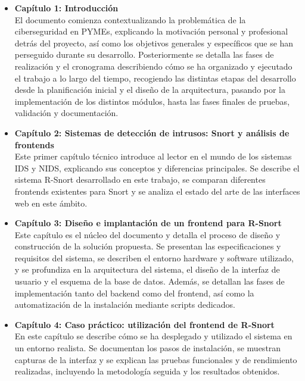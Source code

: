 \documentclass[11pt,a4paper,twoside]{report}
\begin{document}
\begin{itemize}
	\item \textbf{Capítulo 1: Introducción}\\
	\hspace*{1em}El documento comienza contextualizando la problemática de la ciberseguridad en PYMEs, explicando la motivación personal y profesional detrás del proyecto, así como los objetivos generales y específicos que se han perseguido durante su desarrollo. Posteriormente se detalla las fases de realización y el cronograma describiendo cómo se ha organizado y ejecutado el trabajo a lo largo del tiempo, recogiendo las distintas etapas del desarrollo desde la planificación inicial y el diseño de la arquitectura, pasando por la implementación de los distintos módulos, hasta las fases finales de pruebas, validación y documentación.
	
	\item \textbf{Capítulo 2: Sistemas de detección de intrusos: Snort y análisis de frontends}\\
	\hspace*{1em}Este primer capítulo técnico introduce al lector en el mundo de los sistemas IDS y NIDS, explicando sus conceptos y diferencias principales. Se describe el sistema R-Snort desarrollado en este trabajo, se comparan diferentes frontends existentes para Snort y se analiza el estado del arte de las interfaces web en este ámbito.
	
	\item \textbf{Capítulo 3: Diseño e implantación de un frontend para R-Snort}\\
	\hspace*{1em}Este capítulo es el núcleo del documento y detalla el proceso de diseño y construcción de la solución propuesta. Se presentan las especificaciones y requisitos del sistema, se describen el entorno hardware y software utilizado, y se profundiza en la arquitectura del sistema, el diseño de la interfaz de usuario y el esquema de la base de datos. Además, se detallan las fases de implementación tanto del backend como del frontend, así como la automatización de la instalación mediante scripts dedicados.
	
	\item \textbf{Capítulo 4: Caso práctico: utilización del frontend de R-Snort}\\
	\hspace*{1em}En este capítulo se describe cómo se ha desplegado y utilizado el sistema en un entorno realista. Se documentan los pasos de instalación, se muestran capturas de la interfaz y se explican las pruebas funcionales y de rendimiento realizadas, incluyendo la metodología seguida y los resultados obtenidos.
	

\end{itemize}
\end{document}
